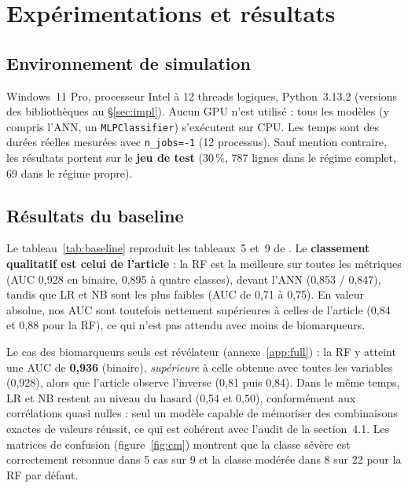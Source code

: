 \section{Expérimentations et résultats}

\subsection{Environnement de simulation}
Windows~11 Pro, processeur Intel à 12 threads logiques, Python~3.13.2 (versions des bibliothèques au §\ref{sec:impl}). Aucun GPU n'est utilisé : tous les modèles (y compris l'ANN, un \texttt{MLPClassifier}) s'exécutent sur CPU. Les temps sont des durées réelles mesurées avec \texttt{n\_jobs=-1} (12 processus). Sauf mention contraire, les résultats portent sur le \textbf{jeu de test} (30\,\%, 787 lignes dans le régime complet, 69 dans le régime propre).

\subsection{Résultats du baseline}
\begin{table}[t]\centering\caption{Baseline (hyperparamètres par défaut), régime complet, \emph{toutes variables}, jeu de test. F1$_p$ : $F_1$ pondéré ; F1$_m$ : $F_1$ macro. En gras : meilleure valeur de la colonne.}\label{tab:baseline}
\footnotesize
\end{table}

Le tableau~\ref{tab:baseline} reproduit les tableaux~5 et~9 de \cite{bader2024}. Le \textbf{classement qualitatif est celui de l'article} : la RF est la meilleure sur toutes les métriques (AUC 0,928 en binaire, 0,895 à quatre classes), devant l'ANN (0,853 / 0,847), tandis que LR et NB sont les plus faibles (AUC de 0,71 à 0,75). En valeur absolue, nos AUC sont toutefois nettement supérieures à celles de l'article (0,84 et 0,88 pour la RF), ce qui n'est pas attendu avec moins de biomarqueurs.

Le cas des biomarqueurs seuls est révélateur (annexe~\ref{app:full}) : la RF y atteint une AUC de \textbf{0,936} (binaire), \emph{supérieure} à celle obtenue avec toutes les variables (0,928), alors que l'article observe l'inverse (0,81 puis 0,84). Dans le même temps, LR et NB restent au niveau du hasard (0,54 et 0,50), conformément aux corrélations quasi nulles : seul un modèle capable de \og mémoriser \fg{} des combinaisons exactes de valeurs réussit, ce qui est cohérent avec l'audit de la section~4.1. Les matrices de confusion (figure~\ref{fig:cm}) montrent que la classe sévère est correctement reconnue dans 5 cas sur 9 et la classe modérée dans 8 sur 22 pour la RF par défaut.

